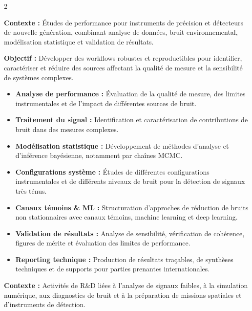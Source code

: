 \documentclass[8pt,a4paper,ragged2e,withhyper]{altacv}
\begin{document}
\begin{paracol}{2}
\divider


\textbf{Contexte :} Études de performance pour instruments de précision et détecteurs de nouvelle génération, combinant analyse de données, bruit environnemental, modélisation statistique et validation de résultats.

\textbf{Objectif :} Développer des workflows robustes et reproductibles pour identifier, caractériser et réduire des sources affectant la qualité de mesure et la sensibilité de systèmes complexes.

\begin{itemize}
  \item \textbf{Analyse de performance :} Évaluation de la qualité de mesure, des limites instrumentales et de l’impact de différentes sources de bruit.
  \item \textbf{Traitement du signal :} Identification et caractérisation de contributions de bruit dans des mesures complexes.
  \item \textbf{Modélisation statistique :} Développement de méthodes d’analyse et d’inférence bayésienne, notamment par chaînes MCMC.
  \item \textbf{Configurations système :} Études de différentes configurations instrumentales et de différents niveaux de bruit pour la détection de signaux très ténus.
  \item \textbf{Canaux témoins \& ML :} Structuration d’approches de réduction de bruits non stationnaires avec canaux témoins, machine learning et deep learning.
  \item \textbf{Validation de résultats :} Analyse de sensibilité, vérification de cohérence, figures de mérite et évaluation des limites de performance.
  \item \textbf{Reporting technique :} Production de résultats traçables, de synthèses techniques et de supports pour parties prenantes internationales.
\end{itemize}

\divider


\textbf{Contexte :} Activités de R\&D liées à l’analyse de signaux faibles, à la simulation numérique, aux diagnostics de bruit et à la préparation de missions spatiales et d’instruments de détection.


\end{paracol}
\end{document}
